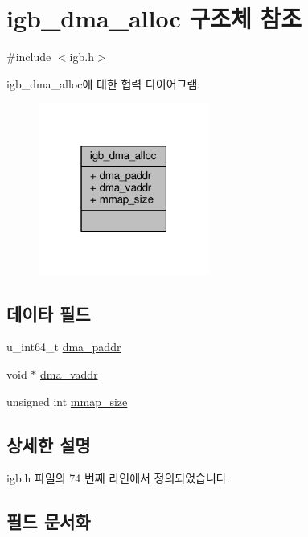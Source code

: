 \hypertarget{structigb__dma__alloc}{}\section{igb\+\_\+dma\+\_\+alloc 구조체 참조}
\label{structigb__dma__alloc}


{\ttfamily \#include $<$igb.\+h$>$}



igb\+\_\+dma\+\_\+alloc에 대한 협력 다이어그램\+:
\nopagebreak
\begin{figure}[H]
\begin{center}
\leavevmode
\includegraphics[width=159pt]{structigb__dma__alloc__coll__graph}
\end{center}
\end{figure}
\subsection*{데이타 필드}
\begin{DoxyCompactItemize}
\item 
u\+\_\+int64\+\_\+t \hyperlink{structigb__dma__alloc_a634628ebb0fecc5be46345b286cce0ef}{dma\+\_\+paddr}
\item 
void $\ast$ \hyperlink{structigb__dma__alloc_a1a7aec22103dc161f23a441da520af5b}{dma\+\_\+vaddr}
\item 
unsigned int \hyperlink{structigb__dma__alloc_a8258a70481ee5ece54c23de98e767611}{mmap\+\_\+size}
\end{DoxyCompactItemize}


\subsection{상세한 설명}


igb.\+h 파일의 74 번째 라인에서 정의되었습니다.



\subsection{필드 문서화}
